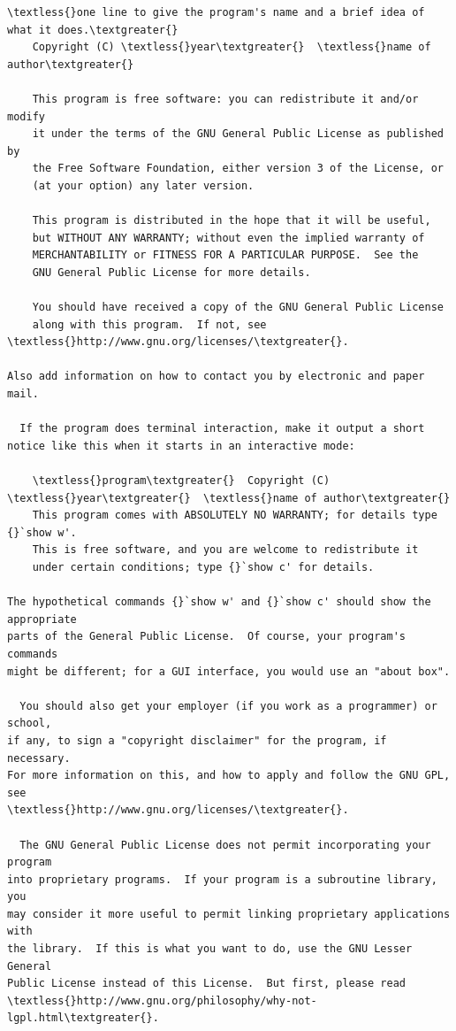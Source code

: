 \documentclass[letterpaper,10pt,english]{sphinxmanual}
\begin{document}
\begin{Verbatim}[commandchars=\\\{\}]
    \textless{}one line to give the program's name and a brief idea of what it does.\textgreater{}
    Copyright (C) \textless{}year\textgreater{}  \textless{}name of author\textgreater{}

    This program is free software: you can redistribute it and/or modify
    it under the terms of the GNU General Public License as published by
    the Free Software Foundation, either version 3 of the License, or
    (at your option) any later version.

    This program is distributed in the hope that it will be useful,
    but WITHOUT ANY WARRANTY; without even the implied warranty of
    MERCHANTABILITY or FITNESS FOR A PARTICULAR PURPOSE.  See the
    GNU General Public License for more details.

    You should have received a copy of the GNU General Public License
    along with this program.  If not, see \textless{}http://www.gnu.org/licenses/\textgreater{}.

Also add information on how to contact you by electronic and paper mail.

  If the program does terminal interaction, make it output a short
notice like this when it starts in an interactive mode:

    \textless{}program\textgreater{}  Copyright (C) \textless{}year\textgreater{}  \textless{}name of author\textgreater{}
    This program comes with ABSOLUTELY NO WARRANTY; for details type {}`show w'.
    This is free software, and you are welcome to redistribute it
    under certain conditions; type {}`show c' for details.

The hypothetical commands {}`show w' and {}`show c' should show the appropriate
parts of the General Public License.  Of course, your program's commands
might be different; for a GUI interface, you would use an "about box".

  You should also get your employer (if you work as a programmer) or school,
if any, to sign a "copyright disclaimer" for the program, if necessary.
For more information on this, and how to apply and follow the GNU GPL, see
\textless{}http://www.gnu.org/licenses/\textgreater{}.

  The GNU General Public License does not permit incorporating your program
into proprietary programs.  If your program is a subroutine library, you
may consider it more useful to permit linking proprietary applications with
the library.  If this is what you want to do, use the GNU Lesser General
Public License instead of this License.  But first, please read
\textless{}http://www.gnu.org/philosophy/why-not-lgpl.html\textgreater{}.
\end{Verbatim}
\end{document}
